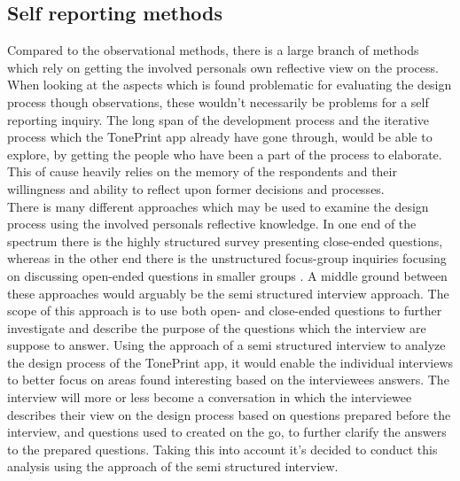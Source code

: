 \subsection*{Self reporting methods}
\label{MethodInterview}
Compared to the observational methods, there is a large branch of methods which rely on getting the involved personals own reflective view on the process. When looking at the aspects which is found problematic for evaluating the design process though observations, these wouldn't necessarily be problems for a self reporting inquiry. The long span of the development process and the iterative process which the TonePrint app already have gone through, would be able to explore, by getting the people who have been a part of the process to elaborate. This of cause heavily relies on the memory of the respondents and their willingness and ability to reflect upon former decisions and processes.\\
There is many different approaches which may be used to examine the design process using the involved personals reflective knowledge. In one end of the spectrum there is the highly structured survey presenting close-ended questions, whereas in the other end there is the unstructured focus-group inquiries focusing on discussing open-ended questions in smaller groups \textcite{WEB:ConductingSemiStructured}. A middle ground between these approaches would arguably be the semi structured interview approach. The scope of this approach is to use both open- and close-ended questions to further investigate and describe the purpose of the questions which the interview are suppose to answer. Using the approach of a semi structured interview to analyze the design process of the TonePrint app, it would enable the individual interviews to better focus on areas found interesting based on the interviewees answers. The interview will more or less become a conversation in which the interviewee describes their view on the design process based on questions prepared before the interview, and questions used to created on the go, to further clarify the answers to the prepared questions. Taking this into account it's decided to conduct this analysis using the approach of the semi structured interview.\\
\\

